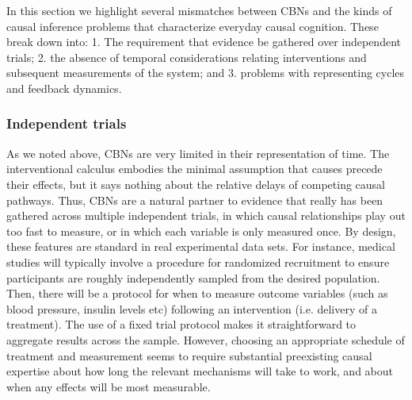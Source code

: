 \documentclass{cambridge7A}%
\begin{document}
In this section we highlight several mismatches between CBNs and the kinds of causal inference problems that characterize everyday causal cognition.  These break down into: 1. The requirement that evidence be gathered over independent trials; 2. the absence of temporal considerations relating interventions and subsequent measurements of the system; and 3. problems with representing cycles and feedback dynamics.

\subsubsection{Independent trials}

As we noted above, CBNs are very limited in their representation of time.  The interventional calculus embodies the minimal assumption that causes precede their effects, but it says nothing about the relative delays of competing causal pathways. %
Thus, CBNs are a natural partner to evidence that really has been gathered across multiple independent trials, in which causal relationships play out too fast to measure, or in which each variable is only measured once.  By design, these features are standard in real experimental data sets.  For instance, medical studies will typically involve a procedure for randomized recruitment to ensure participants are roughly independently sampled from the desired population. Then, there will be a protocol for when to measure outcome variables (such as blood pressure, insulin levels etc) following an intervention (i.e. delivery of a treatment).  The use of a fixed trial protocol makes it straightforward to aggregate results across the sample.  However, choosing an appropriate schedule of treatment and measurement seems to require substantial preexisting causal expertise about how long the relevant mechanisms will take to work, and about when any effects will be most measurable.  %
\end{document}
